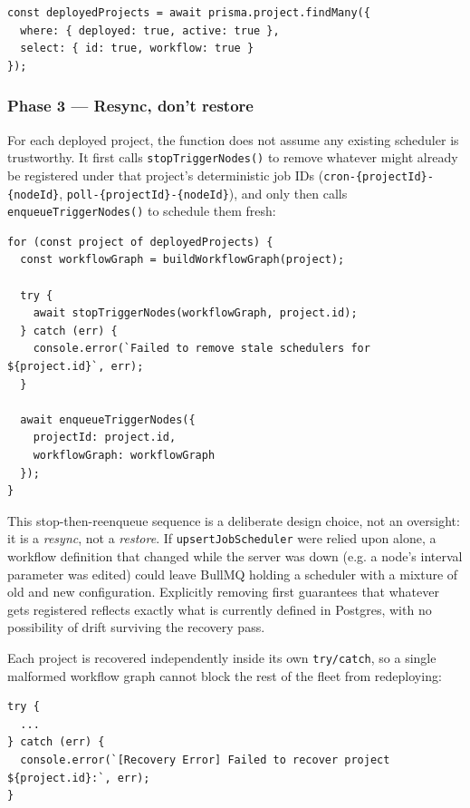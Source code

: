 \begin{lstlisting}
const deployedProjects = await prisma.project.findMany({
  where: { deployed: true, active: true },
  select: { id: true, workflow: true }
});
\end{lstlisting}

\subsubsection{Phase 3 --- Resync, don't restore}

For each deployed project, the function does not assume any existing scheduler is trustworthy. It first calls \texttt{stopTriggerNodes()} to 
remove whatever might already be registered under that project's deterministic job IDs (\texttt{cron-\{projectId\}-\{nodeId\}}, \texttt{poll-\{projectId\}-\{nodeId\}}), 
and only then calls \texttt{enqueueTriggerNodes()} to schedule them fresh:

\begin{lstlisting}
for (const project of deployedProjects) {
  const workflowGraph = buildWorkflowGraph(project);

  try {
    await stopTriggerNodes(workflowGraph, project.id);
  } catch (err) {
    console.error(`Failed to remove stale schedulers for ${project.id}`, err);
  }

  await enqueueTriggerNodes({
    projectId: project.id,
    workflowGraph: workflowGraph
  });
}
\end{lstlisting}

This stop-then-reenqueue sequence is a deliberate design choice, not an oversight: it is a \emph{resync}, not a \emph{restore}. If \texttt{upsertJobScheduler} 
were relied upon alone, a workflow definition that changed while the server was down (e.g. a node's interval parameter was edited) could leave BullMQ 
holding a scheduler with a mixture of old and new configuration. Explicitly removing first guarantees that whatever gets registered reflects
 exactly what is currently defined in Postgres, with no possibility of drift surviving the recovery pass.

Each project is recovered independently inside its own \texttt{try/catch}, so a single malformed workflow graph cannot block the rest of the fleet from redeploying:

\begin{lstlisting}
try {
  ...
} catch (err) {
  console.error(`[Recovery Error] Failed to recover project ${project.id}:`, err);
}
\end{lstlisting}


